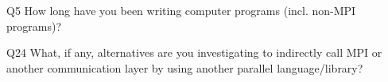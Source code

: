 \begin{description}%
\item{Q5} How long have you been writing computer programs (incl. non-MPI programs)?%
\item{Q24} What, if any, alternatives are you investigating to indirectly call MPI or another communication layer by using another parallel language/library?%
\end{description}%
